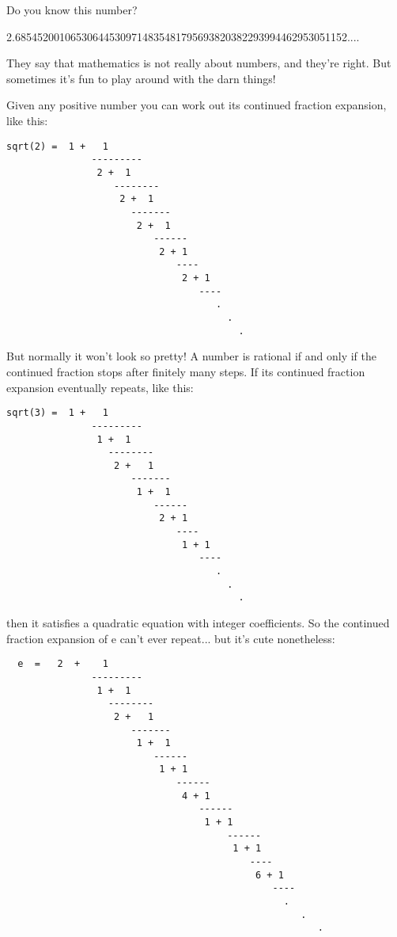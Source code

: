 

Do you know this number?

2.685452001065306445309714835481795693820382293994462953051152....

They say that mathematics is not really about numbers, and 
they're right.  But sometimes it's fun to play around with 
the darn things!  

Given any positive number you can work out its continued 
fraction expansion, like this:

\begin{verbatim}
sqrt(2) =  1 +   1
               ---------
                2 +  1
                   -------- 
                    2 +  1
                      -------
                       2 +  1
                          ------
                           2 + 1
                              ----  
                               2 + 1
                                  ----
                                     .
                                       .
                                         .

\end{verbatim}
    
But normally it won't look so pretty!  A number is rational if
and only if the continued fraction stops after finitely many steps.  
If its continued fraction expansion eventually repeats, like this:

\begin{verbatim}
sqrt(3) =  1 +   1
               ---------
                1 +  1
                  -------- 
                   2 +   1
                      -------
                       1 +  1
                          ------
                           2 + 1
                              ----  
                               1 + 1
                                  ----
                                     .
                                       .
                                         .
\end{verbatim}
    
then it satisfies a quadratic equation with integer coefficients.  
So the continued fraction expansion of e can't ever repeat... but
it's cute nonetheless:

\begin{verbatim}
  e  =   2  +    1
               ---------
                1 +  1
                  --------
                   2 +   1
                      -------
                       1 +  1
                          ------
                           1 + 1
                              ------
                               4 + 1
                                  ------
                                   1 + 1
                                       ------
                                        1 + 1
                                           ---- 
                                            6 + 1 
                                               ----
                                                 .
                                                    .
                                                       .
\end{verbatim}
    
